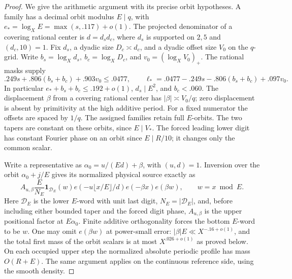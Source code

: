 \documentclass[11pt,a4paper]{article}
\theoremstyle{paperplain}
\numberwithin{equation}{section}
\newcommand{\ind}{\mathbf1}
\begin{document}
\begin{proof}
We give the arithmetic argument with its precise orbit hypotheses.
A family has a decimal orbit modulus \(E\mid q\), with
\(e_*=\log_X E=\max(s,.117)+o(1)\). The projected denominator of
a covering rational center is \(d=d_s d_c\), where \(d_s\) is
supported on \(2,5\) and \((d_c,10)=1\). Fix \(d_s\), a dyadic
size \(D_c\asymp d_c\), and a dyadic offset size \(V_0\) on the
\(q\)-grid. Write \(b_s=\log_Xd_s,\ b_c=\log_XD_c\), and
\(v_0=(\log_X V_0)_+\). The rational masks supply
\begin{equation}\label{dt:analytic-mask-budget}
 .249s+.806(b_s+b_c)+.903v_0\le .0477,\qquad
 \ell_*=.0477-.249s-.806(b_s+b_c)+.097v_0 .
\end{equation}
In particular \(e_*+b_s+b_c\le .192+o(1)\),
\(d_s\mid E^2\), and \(b_c<.060\).
The displacement \(\beta\) from a covering rational center has
\(|\beta|\asymp V_0/q\); zero displacement is absent by primitivity
at the high additive period. For a fixed numerator the offsets
are spaced by \(1/q\). The assigned families retain full \(E\)-orbits.
The two tapers are constant on these orbits, since \(E\mid V_*\).
The forced leading lower digit has constant Fourier phase on an
orbit since \(E\mid R/10\); it changes only the common scalar.

Write a representative as \(\alpha_0=u/(Ed)+\beta\), with
\((u,d)=1\). Inversion over the orbit \(\alpha_0+j/E\) gives its
normalized physical source exactly as
\[
 A_{u,\beta}\frac{E}{N_E}\ind_{\mathcal D_E}(w)
       e(-u\lfloor x/E\rfloor/d)e(-\beta x)e(\beta w),
 \qquad w=x\bmod E .
\]
Here \(\mathcal D_E\) is the lower \(E\)-word with unit last digit,
\(N_E=|\mathcal D_E|\), and, before including either bounded taper
and the forced digit phase, \(A_{u,\beta}\) is the upper positional
factor at \(E\alpha_0\). Finite additive orthogonality forces the
bottom \(E\)-word to be \(w\). One may omit \(e(\beta w)\) at
power-small error: \(|\beta|E\ll X^{-.16+o(1)}\), and the total
first mass of the orbit scalars is at most \(X^{.026+o(1)}\) as
proved below. On each occupied upper step the normalized absolute
periodic profile has mass \(O(R+E)\). The same argument applies on
the continuous reference side, using the smooth density.


\end{proof}
\end{document}
